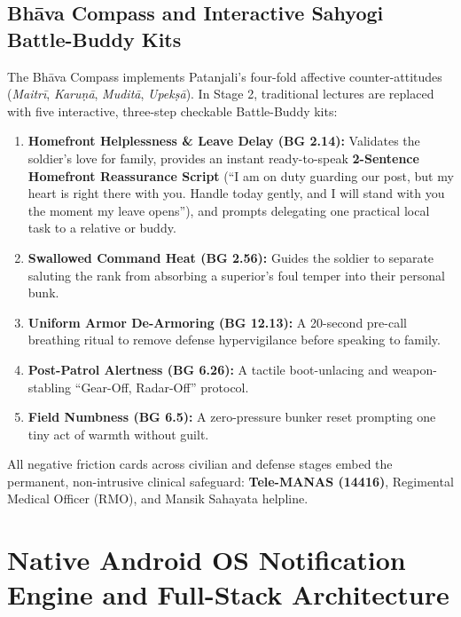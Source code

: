 \documentclass[11pt,a4paper]{article}
\begin{document}
\subsection{Bh\=ava Compass and Interactive Sahyogi Battle-Buddy Kits}
The Bh\=ava Compass implements Patanjali's four-fold affective counter-attitudes (\textit{Maitr\=i}, \textit{Karu\d{n}\=a}, \textit{Mudit\=a}, \textit{Upek\d{s}\=a}). In Stage 2, traditional lectures are replaced with five interactive, three-step checkable Battle-Buddy kits:
\begin{enumerate}
    \item \textbf{Homefront Helplessness \& Leave Delay (BG 2.14):} Validates the soldier's love for family, provides an instant ready-to-speak \textbf{2-Sentence Homefront Reassurance Script} (``I am on duty guarding our post, but my heart is right there with you. Handle today gently, and I will stand with you the moment my leave opens''), and prompts delegating one practical local task to a relative or buddy.
    \item \textbf{Swallowed Command Heat (BG 2.56):} Guides the soldier to separate saluting the rank from absorbing a superior's foul temper into their personal bunk.
    \item \textbf{Uniform Armor De-Armoring (BG 12.13):} A 20-second pre-call breathing ritual to remove defense hypervigilance before speaking to family.
    \item \textbf{Post-Patrol Alertness (BG 6.26):} A tactile boot-unlacing and weapon-stabling ``Gear-Off, Radar-Off'' protocol.
    \item \textbf{Field Numbness (BG 6.5):} A zero-pressure bunker reset prompting one tiny act of warmth without guilt.
\end{enumerate}
All negative friction cards across civilian and defense stages embed the permanent, non-intrusive clinical safeguard: \textbf{Tele-MANAS (14416)}, Regimental Medical Officer (RMO), and Mansik Sahayata helpline.

\section{Native Android OS Notification Engine and Full-Stack Architecture}
\end{document}
